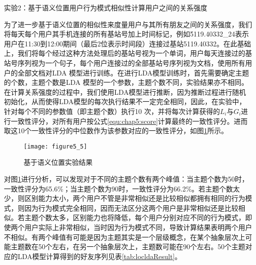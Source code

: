 \par 实验2：基于语义位置用户行为模式相似性计算用户之间的关系强度
\par 为了进一步基于语义位置的相似性来度量用户与其所有朋友之间的关系强度，我们将每天每个用户其手机连接的所有基站号加上时间标记，例如\'5119.40332\_24\'表示用户在11:30到12:00期间（最后2位表示时间段）连接过基站5119.40332。在此基础上，我们将每个经过这种方法处理后的基站号视为一个单词，用户每天连接过的基站号序列视为一个句子，每个用户连接过的全部基站号序列视为文档，使用所有用户的全部文档对LDA 模型进行训练。在进行LDA模型训练时，首先需要确定主题的个数，主题个数是LDA 模型的一个参数，主题个数不同，实验结果亦不相同。在计算关系强度的过程中，我们使用LDA模型进行推断，因为推断过程进行随机初始化，从而使得LDA模型的每次执行结果不一定完全相同，因此，在实验中，针对每个不同的参数值（即主题个数）执行10 次，并将每次计算获得的$L_{i}$与$G_{i}$进行一致性评分，对所有用户按公式\ref{equ:chap5:score}计算最终的一致性评分。进而取这10个一致性评分的中位数作为该参数对应的一致性评分，如图\ref{fig:5_5}所示。
\begin{figure}[htp]
\centering
\texttt{[image: figure5\_5]}
\caption{基于语义位置实验结果}
\label{fig:5_5}
\end{figure}
\par 对图\ref{fig:5_5}进行分析，可以发现对于不同的主题个数有两个峰值：当主题个数为50时，一致性评分为65.6\%；当主题个数为90时，一致性评分为66.2\%。若主题个数太少，则区别能力太小，两个用户不管是非常相似还是比较相似都拥有相同的行为模式，则因为行为模式完全相同，因而无法区分这两个用户是非常相似还是比较相似。若主题个数太多，区别能力也将降低，每个用户分别对应不同的行为模式，即使两个用户实际上非常相似，当时因为行为模式不同，导致计算结果表明两个用户不相似。有两个峰值有可能是因为主题其实是一个层级概念，在某个抽象层次上可能主题数在50个左右，在另一个抽象层次上，主题数可能在90个左右。50个主题对应的LDA模型计算得到的好友序列见表\ref{tab:locldaResult}。
